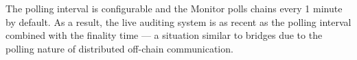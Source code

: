 The polling interval is configurable and the Monitor polls chains
every 1 minute by default.  As a result, the live auditing system is
as recent as the polling interval combined with the finality time
--- a situation similar to bridges due to the polling nature of
distributed off-chain communication.






